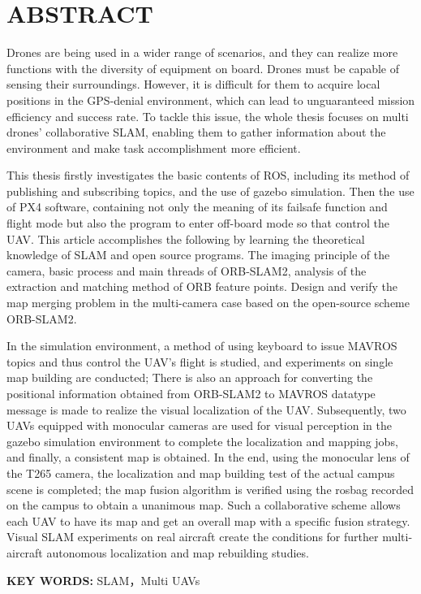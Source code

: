 \chapter*{ABSTRACT}
\vspace{1em}
Drones are being used in a wider range of scenarios, and they can realize more functions with the diversity of equipment on board.
Drones must be capable of sensing their surroundings. 
However, it is difficult for them to acquire local positions in the GPS-denial environment, which can lead to unguaranteed mission efficiency and success rate. 
To tackle this issue, the whole thesis focuses on multi drones' collaborative SLAM, enabling them to gather information about the environment and make task accomplishment more efficient.

This thesis firstly investigates the basic contents of ROS, including its method of publishing and subscribing topics, and the use of gazebo simulation.
Then the use of PX4 software, containing not only the meaning of its failsafe function and flight mode but also the program to enter off-board mode so that control the UAV.
This article accomplishes the following by learning the theoretical knowledge of SLAM and open source programs.
The imaging principle of the camera, basic process and main threads of ORB-SLAM2, analysis of the extraction and matching method of ORB feature points.
Design and verify the map merging problem in the multi-camera case based on the open-source scheme ORB-SLAM2.

In the simulation environment, a method of using keyboard to issue MAVROS topics and thus control the UAV's flight is studied, and experiments on single map building are conducted; There is also an approach for converting the positional information obtained from ORB-SLAM2 to MAVROS datatype message is made to realize the visual localization of the UAV.
Subsequently, two UAVs equipped with monocular cameras are used for visual perception in the gazebo simulation environment to complete the localization and mapping jobs, and finally, a consistent map is obtained.
In the end, using the monocular lens of the T265 camera, the localization and map building test of the actual campus scene is completed; the map fusion algorithm is verified using the rosbag recorded on the campus to obtain a unanimous map.
Such a collaborative scheme allows each UAV to have its map and get an overall map with a specific fusion strategy. Visual SLAM experiments on real aircraft create the conditions for further multi-aircraft autonomous localization and map rebuilding studies.

\vspace{0.1in}
\noindent \textbf{KEY WORDS:} SLAM，Multi UAVs

